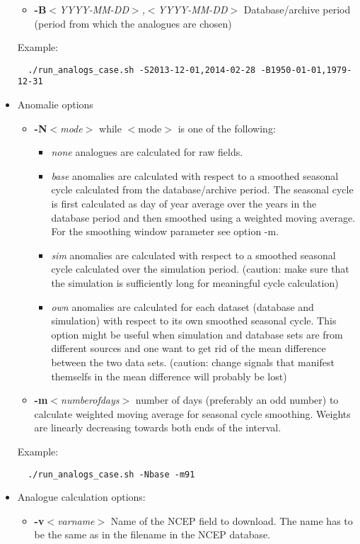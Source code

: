 \documentclass[11p,a4paper]{article}
\begin{document}
\begin{itemize}
\begin{itemize}
  \item \textbf{-B}\textit{$<$YYYY-MM-DD$>$,$<$YYYY-MM-DD$>$} Database/archive period (period from which the analogues are chosen)
 \end{itemize}  
 Example:
 \begin{verbatim}
  ./run_analogs_case.sh -S2013-12-01,2014-02-28 -B1950-01-01,1979-12-31
 \end{verbatim}
 \item Anomalie options
 \begin{itemize}
  \item \textbf{-N}\textit{$<$mode$>$} while $<$mode$>$ is one of the following:
  \begin{itemize}
   \item \textit{none}  analogues are calculated for raw fields.
   \item \textit{base}  anomalies are calculated with respect to a smoothed seasonal cycle calculated from the database/archive period. The seasonal cycle is first calculated as day of year average over the years in the database period and then smoothed using a weighted moving average. For the smoothing window parameter see option -m. 
   \item \textit{sim} anomalies are calculated with respect to a smoothed seasonal cycle calculated over the simulation period. (caution: make sure that the simulation is sufficiently long for meaningful cycle calculation)
   \item \textit{own} anomalies are calculated for each dataset (database and simulation) with respect to its own smoothed seasonal cycle. This option might be useful when simulation and database sets are from different sources and one want to get rid of the mean difference between the two data sets. (caution: change signals that manifest themselfs in the mean difference will probably be lost)
  \end{itemize}  
  \item \textbf{-m}\textit{$<$numberofdays$>$} number of days (preferably an odd number) to calculate weighted moving average for seasonal cycle smoothing. Weights are linearly decreasing towards  both ends of the interval.
 \end{itemize}
 Example:
 \begin{verbatim}
  ./run_analogs_case.sh -Nbase -m91
 \end{verbatim}
 \item Analogue calculation options:
 \begin{itemize}
  \item \textbf{-v}\textit{$<$varname$>$} Name of the NCEP field to download. The name has to be the same as in the filename in the NCEP database.

\end{itemize}
\end{itemize}
\end{document}
